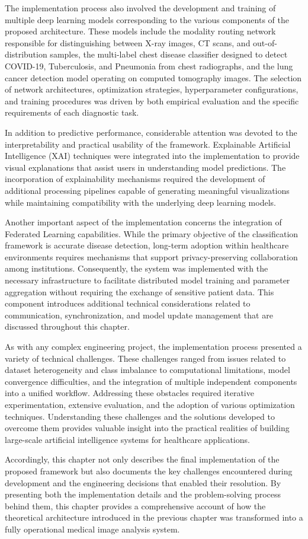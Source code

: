 The implementation process also involved the development and training of multiple deep learning models corresponding to the various components of the proposed architecture. These models include the modality routing network responsible for distinguishing between X-ray images, CT scans, and out-of-distribution samples, the multi-label chest disease classifier designed to detect COVID-19, Tuberculosis, and Pneumonia from chest radiographs, and the lung cancer detection model operating on computed tomography images. The selection of network architectures, optimization strategies, hyperparameter configurations, and training procedures was driven by both empirical evaluation and the specific requirements of each diagnostic task.

In addition to predictive performance, considerable attention was devoted to the interpretability and practical usability of the framework. Explainable Artificial Intelligence (XAI) techniques were integrated into the implementation to provide visual explanations that assist users in understanding model predictions. The incorporation of explainability mechanisms required the development of additional processing pipelines capable of generating meaningful visualizations while maintaining compatibility with the underlying deep learning models.

Another important aspect of the implementation concerns the integration of Federated Learning capabilities. While the primary objective of the classification framework is accurate disease detection, long-term adoption within healthcare environments requires mechanisms that support privacy-preserving collaboration among institutions. Consequently, the system was implemented with the necessary infrastructure to facilitate distributed model training and parameter aggregation without requiring the exchange of sensitive patient data. This component introduces additional technical considerations related to communication, synchronization, and model update management that are discussed throughout this chapter.

As with any complex engineering project, the implementation process presented a variety of technical challenges. These challenges ranged from issues related to dataset heterogeneity and class imbalance to computational limitations, model convergence difficulties, and the integration of multiple independent components into a unified workflow. Addressing these obstacles required iterative experimentation, extensive evaluation, and the adoption of various optimization techniques. Understanding these challenges and the solutions developed to overcome them provides valuable insight into the practical realities of building large-scale artificial intelligence systems for healthcare applications.

Accordingly, this chapter not only describes the final implementation of the proposed framework but also documents the key challenges encountered during development and the engineering decisions that enabled their resolution. By presenting both the implementation details and the problem-solving process behind them, this chapter provides a comprehensive account of how the theoretical architecture introduced in the previous chapter was transformed into a fully operational medical image analysis system.